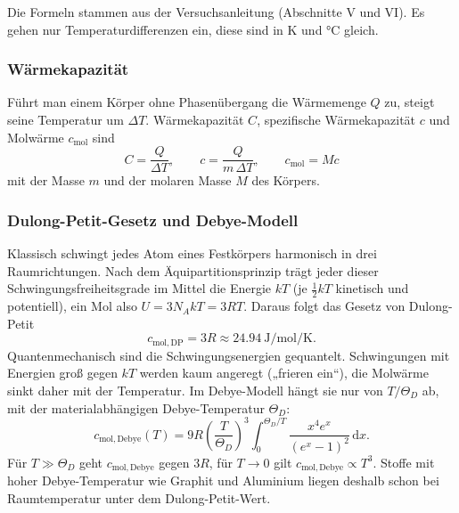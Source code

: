 \documentclass{article}
\begin{document}
Die Formeln stammen aus der Versuchsanleitung (Abschnitte V und VI). Es gehen nur
Temperaturdifferenzen ein, diese sind in \si{\kelvin} und \si{\degreeCelsius} gleich.

\subsubsection{Wärmekapazität}
\label{sec:waermekapazitaet}

Führt man einem Körper ohne Phasenübergang die Wärmemenge $Q$ zu, steigt seine Temperatur um
$\Delta T$. Wärmekapazität $C$, spezifische Wärmekapazität $c$ und Molwärme $c_\mathrm{mol}$ sind
\begin{equation}
	C = \frac{Q}{\Delta T} , \qquad c = \frac{Q}{m\,\Delta T} , \qquad c_\mathrm{mol} = M c
	\label{eq:molwaerme}
\end{equation}
mit der Masse $m$ und der molaren Masse $M$ des Körpers.

\subsubsection{Dulong-Petit-Gesetz und Debye-Modell}
\label{sec:debye}

Klassisch schwingt jedes Atom eines Festkörpers harmonisch in drei Raumrichtungen. Nach dem
Äquipartitionsprinzip trägt jeder dieser Schwingungsfreiheitsgrade im Mittel die Energie $kT$
(je $\tfrac{1}{2}kT$ kinetisch und potentiell), ein Mol also $U = 3 N_A k T = 3RT$. Daraus folgt das
Gesetz von Dulong-Petit
\begin{equation}
	c_\mathrm{mol,DP} = 3R \approx \qty{24.94}{\joule\per\mol\per\kelvin} .
	\label{eq:dulong_petit}
\end{equation}
Quantenmechanisch sind die Schwingungsenergien gequantelt. Schwingungen mit Energien groß gegen $kT$
werden kaum angeregt („frieren ein“), die Molwärme sinkt daher mit der Temperatur. Im Debye-Modell
hängt sie nur von $T/\Theta_D$ ab, mit der materialabhängigen Debye-Temperatur $\Theta_D$:
\begin{equation}
	c_\mathrm{mol,Debye}(T) = 9R \left(\frac{T}{\Theta_D}\right)^{3} \int_{0}^{\Theta_D/T} \frac{x^4 e^x}{\left(e^x - 1\right)^2}\,\mathrm{d}x .
	\label{eq:debye}
\end{equation}
Für $T \gg \Theta_D$ geht $c_\mathrm{mol,Debye}$ gegen $3R$, für $T \to 0$ gilt
$c_\mathrm{mol,Debye} \propto T^3$. Stoffe mit hoher Debye-Temperatur wie Graphit und Aluminium
liegen deshalb schon bei Raumtemperatur unter dem Dulong-Petit-Wert.
\end{document}
